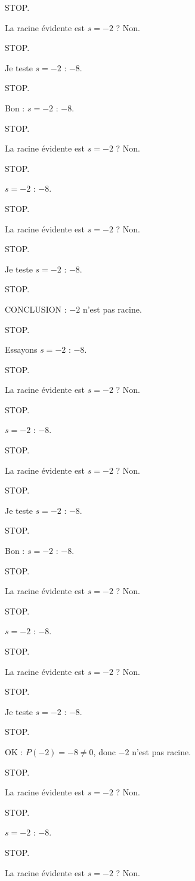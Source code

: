 \documentclass[11pt]{article}
\begin{document}
\begin{exoresolu}
\begin{enumerate}
STOP. 

La racine évidente est $s = -2$ ? Non. 

STOP. 

Je teste $s = -2$ : $-8$. 

STOP. 

Bon : $s = -2$ : $-8$. 

STOP. 

La racine évidente est $s = -2$ ? Non. 

STOP. 

$s = -2$ : $-8$. 

STOP. 

La racine évidente est $s = -2$ ? Non. 

STOP. 

Je teste $s = -2$ : $-8$. 

STOP. 

CONCLUSION : $-2$ n'est pas racine. 

STOP. 

Essayons $s = -2$ : $-8$. 

STOP. 

La racine évidente est $s = -2$ ? Non. 

STOP. 

$s = -2$ : $-8$. 

STOP. 

La racine évidente est $s = -2$ ? Non. 

STOP. 

Je teste $s = -2$ : $-8$. 

STOP. 

Bon : $s = -2$ : $-8$. 

STOP. 

La racine évidente est $s = -2$ ? Non. 

STOP. 

$s = -2$ : $-8$. 

STOP. 

La racine évidente est $s = -2$ ? Non. 

STOP. 

Je teste $s = -2$ : $-8$. 

STOP. 

OK : $P(-2) = -8 \neq 0$, donc $-2$ n'est pas racine. 

STOP. 

La racine évidente est $s = -2$ ? Non. 

STOP. 

$s = -2$ : $-8$. 

STOP. 

La racine évidente est $s = -2$ ? Non. 


\end{enumerate}
\end{exoresolu}
\end{document}
